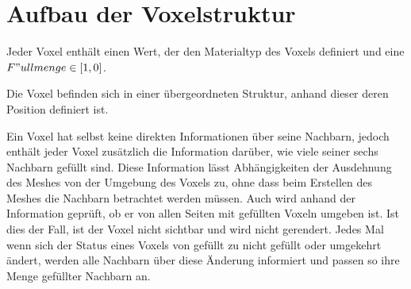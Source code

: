 
\section{Aufbau der Voxelstruktur}
\label{sec:aufbauVoxelstruktur}
Jeder Voxel enthält einen Wert, der den Materialtyp des Voxels definiert und eine $F"ullmenge \in [1,0]$.

Die Voxel befinden sich in einer übergeordneten Struktur, anhand dieser deren Position definiert ist.

Ein Voxel hat selbst keine direkten Informationen über seine Nachbarn, jedoch enthält jeder Voxel zusätzlich die Information darüber, wie viele seiner sechs Nachbarn gefüllt sind. Diese Information lässt Abhängigkeiten der Ausdehnung des Meshes von der Umgebung des Voxels zu, ohne dass beim Erstellen des Meshes die Nachbarn betrachtet werden müssen. Auch wird anhand der Information geprüft, ob er von allen Seiten mit gefüllten Voxeln umgeben ist. Ist dies der Fall, ist der Voxel nicht sichtbar und wird nicht gerendert. Jedes Mal wenn sich der Status eines Voxels von gefüllt zu nicht gefüllt oder umgekehrt ändert, werden alle Nachbarn über diese Änderung informiert und passen so ihre Menge gefüllter Nachbarn an.

